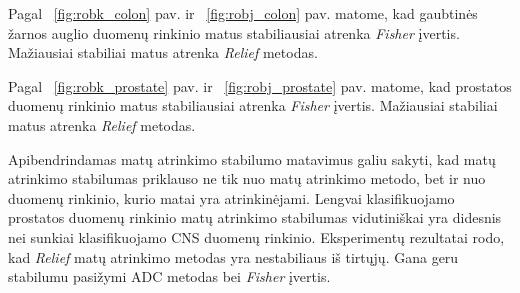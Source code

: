 Pagal ~\ref{fig:robk_colon} pav. ir ~\ref{fig:robj_colon} pav. matome, kad gaubtinės žarnos auglio duomenų rinkinio matus stabiliausiai atrenka \textit{Fisher} įvertis. Mažiausiai stabiliai matus atrenka \textit{Relief} metodas.

Pagal ~\ref{fig:robk_prostate} pav. ir ~\ref{fig:robj_prostate} pav. matome, kad prostatos duomenų rinkinio matus stabiliausiai atrenka \textit{Fisher} įvertis. Mažiausiai stabiliai matus atrenka \textit{Relief} metodas.

Apibendrindamas matų atrinkimo stabilumo matavimus galiu sakyti, kad matų atrinkimo stabilumas priklauso ne tik nuo matų atrinkimo metodo, bet ir nuo duomenų rinkinio, kurio matai yra atrinkinėjami. Lengvai klasifikuojamo prostatos duomenų rinkinio matų atrinkimo stabilumas vidutiniškai yra didesnis nei sunkiai klasifikuojamo CNS duomenų rinkinio. Eksperimentų rezultatai rodo, kad \textit{Relief} matų atrinkimo metodas yra nestabiliaus iš tirtųjų. Gana geru stabilumu pasižymi ADC metodas bei \textit{Fisher} įvertis.